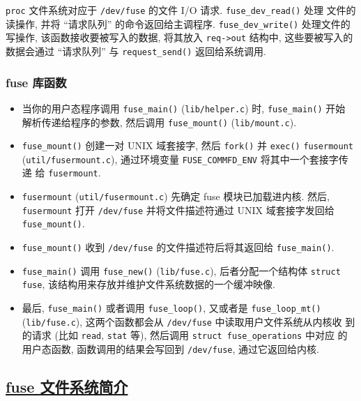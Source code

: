 \documentclass[nofonts]{ctexart}
\begin{document}
\texttt{proc} 文件系统对应于 \texttt{/dev/fuse} 的文件 I/O 请求.
\texttt{fuse\_dev\_read()} 处理 文件的读操作, 并将 ``请求队列''
的命令返回给主调程序. \texttt{fuse\_dev\_write()} 处理文件的写操作,
该函数接收要被写入的数据, 将其放入 \texttt{req-\textgreater{}out}
结构中, 这些要被写入的数据会通过 ``请求队列'' 与
\texttt{request\_send()} 返回给系统调用.

\subsubsection{fuse 库函数}\label{fuse-ux5e93ux51fdux6570}

\begin{itemize}
\item
  当你的用户态程序调用 \texttt{fuse\_main()} (\texttt{lib/helper.c}) 时,
  \texttt{fuse\_main()} 开始 解析传递给程序的参数, 然后调用
  \texttt{fuse\_mount()} (\texttt{lib/mount.c}).
\item
  \texttt{fuse\_mount()} 创建一对 UNIX 域套接字, 然后 \texttt{fork()} 并
  \texttt{exec()} \texttt{fusermount} (\texttt{util/fusermount.c}),
  通过环境变量 \texttt{FUSE\_COMMFD\_ENV} 将其中一个套接字传递 给
  \texttt{fusermount}.
\item
  \texttt{fusermount} (\texttt{util/fusermount.c}) 先确定 fuse
  模块已加载进内核. 然后, \texttt{fusermount} 打开 \texttt{/dev/fuse}
  并将文件描述符通过 UNIX 域套接字发回给 \texttt{fuse\_mount()}.
\item
  \texttt{fuse\_mount()} 收到 \texttt{/dev/fuse}
  的文件描述符后将其返回给 \texttt{fuse\_main()}.
\item
  \texttt{fuse\_main()} 调用 \texttt{fuse\_new()} (\texttt{lib/fuse.c}),
  后者分配一个结构体 \texttt{struct fuse},
  该结构用来存放并维护文件系统数据的一个缓冲映像.
\item
  最后, \texttt{fuse\_main()} 或者调用 \texttt{fuse\_loop()}, 又或者是
  \texttt{fuse\_loop\_mt()} (\texttt{lib/fuse.c}), 这两个函数都会从
  \texttt{/dev/fuse} 中读取用户文件系统从内核收 到的请求 (比如
  \texttt{read}, \texttt{stat} 等), 然后调用
  \texttt{struct fuse\_operations} 中对应 的用户态函数,
  函数调用的结果会写回到 \texttt{/dev/fuse}, 通过它返回给内核.
\end{itemize}

\subsection{\href{http://lxr.free-electrons.com/source/Documentation/filesystems/fuse.txt}{fuse
文件系统简介}}\label{fuse-ux6587ux4ef6ux7cfbux7edfux7b80ux4ecb}
\end{document}
